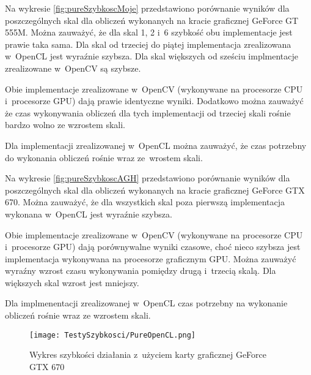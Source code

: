 Na wykresie \ref{fig:pureSzybkoscMoje} przedstawiono porównanie wyników dla poszczególnych skal dla obliczeń wykonanych na kracie graficznej GeForce GT 555M. Można zauważyć, że dla skal 1, 2 i~6 szybkość obu implementacje jest prawie taka sama. Dla skal od trzeciej do piątej implementacja zrealizowana w~OpenCL jest wyraźnie szybsza. Dla skal większych od sześciu implmentacje zrealizowane w~OpenCV są szybsze.

Obie implementacje zrealizowane w~OpenCV (wykonywane na procesorze CPU i~procesorze GPU) dają prawie identyczne wyniki. Dodatkowo można zauważyć że czas wykonywania obliczeń dla tych implementacji od trzeciej skali rośnie bardzo wolno ze wzrostem skali.

Dla implementacji zrealizowanej w~OpenCL można zauważyć, że czas potrzebny do wykonania obliczeń rośnie wraz ze~wrostem skali.

Na wykresie \ref{fig:pureSzybkoscAGH} przedstawiono porównanie wyników dla poszczególnych skal dla obliczeń wykonanych na kracie graficznej GeForce GTX 670. Można zauważyć, że dla wszystkich skal poza pierwszą implementacja wykonana w~OpenCL jest wyraźnie szybsza.

Obie implementacje zrealizowane w~OpenCV (wykonywane na procesorze CPU i~procesorze GPU) dają porównywalne wyniki czasowe, choć nieco szybsza jest implementacja wykonywana na procesorze graficznym GPU. Można zauważyć wyraźny wzrost czasu wykonywania pomiędzy drugą i~trzecią skalą. Dla większych skal wzrost jest mniejszy. 

Dla implmenentacji zrealizowanej w~OpenCL czas potrzebny na wykonanie obliczeń rośnie wraz ze wzrostem skali. 

\begin{figure}[h]
\begin{center}
\texttt{[image: TestySzybkosci/PureOpenCL.png]}
\end{center}
\caption{Wykres szybkości działania z~użyciem karty graficznej GeForce GTX 670}
\label{fig:pureOpenCL}
\end{figure}

